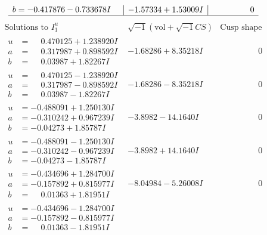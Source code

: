 \documentclass[1p]{elsarticle_modified}
\theoremstyle{definition}
\newcommand{\I}{\sqrt{-1}}
\begin{document}
$$\begin{array}{c|c|c}
\begin{aligned}
b &= -0.417876 - 0.733678 I\end{aligned}
 & -1.57334 + 1.53009 I & \phantom{-0.000000 } 0\\
 \hline 
 \end{array}$$\newpage$$\begin{array}{c|c|c}  
\text{Solutions to }I^u_{1}& \I (\text{vol} + \sqrt{-1}CS) & \text{Cusp shape}\\
 \hline 
\begin{aligned}
u &= \phantom{-}0.470125 + 1.238920 I \\
a &= \phantom{-}0.317987 + 0.898592 I \\
b &= \phantom{-}0.03987 + 1.82267 I\end{aligned}
 & -1.68286 + 8.35218 I & \phantom{-0.000000 } 0 \\ \hline\begin{aligned}
u &= \phantom{-}0.470125 - 1.238920 I \\
a &= \phantom{-}0.317987 - 0.898592 I \\
b &= \phantom{-}0.03987 - 1.82267 I\end{aligned}
 & -1.68286 - 8.35218 I & \phantom{-0.000000 } 0 \\ \hline\begin{aligned}
u &= -0.488091 + 1.250130 I \\
a &= -0.310242 + 0.967239 I \\
b &= -0.04273 + 1.85787 I\end{aligned}
 & -3.8982 - 14.1640 I & \phantom{-0.000000 } 0 \\ \hline\begin{aligned}
u &= -0.488091 - 1.250130 I \\
a &= -0.310242 - 0.967239 I \\
b &= -0.04273 - 1.85787 I\end{aligned}
 & -3.8982 + 14.1640 I & \phantom{-0.000000 } 0 \\ \hline\begin{aligned}
u &= -0.434696 + 1.284700 I \\
a &= -0.157892 + 0.815977 I \\
b &= \phantom{-}0.01363 + 1.81951 I\end{aligned}
 & -8.04984 - 5.26008 I & \phantom{-0.000000 } 0 \\ \hline\begin{aligned}
u &= -0.434696 - 1.284700 I \\
a &= -0.157892 - 0.815977 I \\
b &= \phantom{-}0.01363 - 1.81951 I\end{aligned}

\end{array}$$
\end{document}
